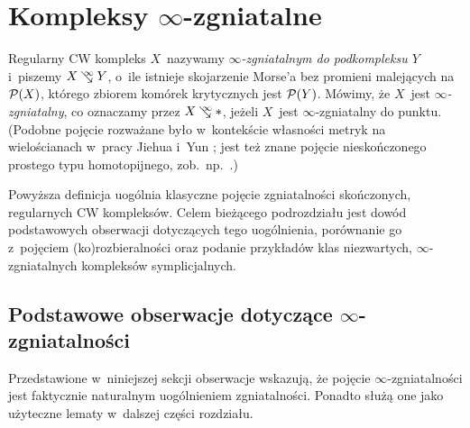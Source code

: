 

\section{\texorpdfstring{Kompleksy $\infty$-zgniatalne}{Kompleksy ∞-zgniatalne}}\label{sec-infty-zgniatalnosc}

Regularny CW kompleks $X$~nazywamy \textit{$\infty$-zgniatalnym do podkompleksu $Y$} i~piszemy $X\infcoll Y$, o~ile istnieje skojarzenie Morse'a bez promieni malejących na $\mathcal{P}(X)$, którego zbiorem komórek krytycznych jest $\mathcal{P}(Y)$. Mówimy, że $X$~jest \mbox{\textit{$\infty$-zgniatalny}}, co oznaczamy przez $X\infcoll *$, jeżeli $X$~jest $\infty$-zgniatalny do punktu. (Podobne pojęcie rozważane było w~kontekście własności metryk na wielościanach w~pracy Jiehua i~Yun \cite{Jiehua91}; jest też znane pojęcie nieskończonego prostego typu homotopijnego, zob.~np.~\cite{Baues01,Hughes96}.)

Powyższa definicja uogólnia klasyczne pojęcie zgniatalności skończonych, regularnych CW kompleksów. Celem bieżącego podrozdziału jest dowód podstawowych obserwacji dotyczących tego uogólnienia, porównanie go z~pojęciem (ko)rozbieralności oraz podanie przykładów klas niezwartych, $\infty$-zgniatalnych kompleksów symplicjalnych.

\subsection{\texorpdfstring{Podstawowe obserwacje dotyczące $\infty$-zgniatalności}{Podstawowe obserwacje dotyczące ∞-zgniatalności}}
Przedstawione w~niniejszej sekcji obserwacje wskazują, że pojęcie \mbox{$\infty$-zgniatalności} jest faktycznie naturalnym uogólnieniem zgniatalności. Ponadto służą one jako użyteczne lematy w~dalszej części rozdziału.

